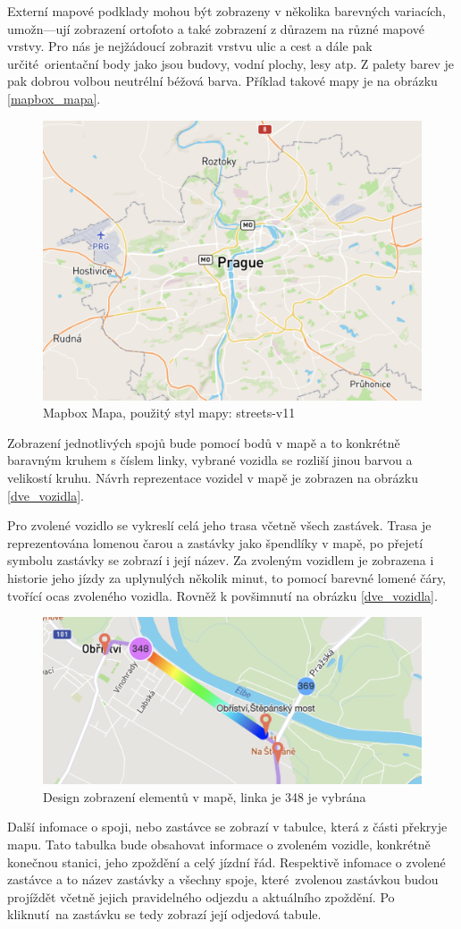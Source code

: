 Externí mapové podklady mohou být zobrazeny v několika barevných variacích, umožn—ují zobrazení ortofoto a také zobrazení z důrazem na různé mapové vrstvy. Pro nás je nejžádoucí zobrazit vrstvu ulic a cest a dále pak určité orientační body jako jsou budovy, vodní plochy, lesy atp. Z palety barev je pak dobrou volbou neutrélní béžová barva. Příklad takové mapy je na obrázku \ref{mapbox_mapa}.

\begin{figure}
	\centering
  \includegraphics[width=0.5\linewidth]{../img/mapa_mapbox.png}
  \caption{Mapbox Mapa, použitý styl mapy: streets-v11}
  \label{fig:mapbox_mapa}
\end{figure}

Zobrazení jednotlivých spojů bude pomocí bodů v mapě a to konkrétně baravným kruhem s číslem linky, vybrané vozidla se rozliší jinou barvou a velikostí kruhu. Návrh reprezentace vozidel v mapě je zobrazen na obrázku \ref{dve_vozidla}.

\bigbreak

Pro zvolené vozidlo se vykreslí celá jeho trasa včetně všech zastávek. Trasa je reprezentována lomenou čarou a zastávky jako špendlíky v mapě, po přejetí symbolu zastávky se zobrazí i její název. Za zvoleným vozidlem je zobrazena i historie jeho jízdy za uplynulých několik minut, to pomocí barevné lomené čáry, tvořící ocas zvoleného vozidla. Rovněž k povšimnutí na obrázku \ref{dve_vozidla}.

\begin{figure}
	\centering
  \includegraphics[width=0.5\linewidth]{../img/dve_vozidla.png}
  \caption{Design zobrazení elementů v mapě, linka je 348 je vybrána}
  \label{fig:dve_vozidla}
\end{figure}

Další infomace o spoji, nebo zastávce se zobrazí v tabulce, která z části překryje mapu. Tato tabulka bude obsahovat informace o zvoleném vozidle, konkrétně konečnou stanici, jeho zpoždění a celý jízdní řád. Respektivě infomace o zvolené zastávce a to název zastávky a všechny spoje, které zvolenou zastávkou budou projíždět včetně jejich pravidelného odjezdu a aktuálního zpoždění. Po kliknutí na zastávku se tedy zobrazí její odjedová tabule.
